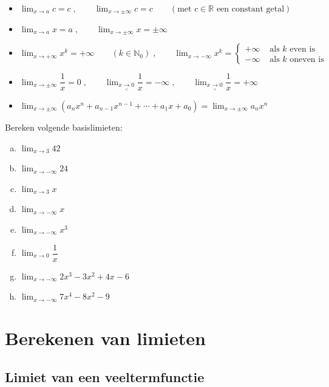 \documentclass[12pt]{article}
\begin{document}
\begin{itemize}
\item $\displaystyle\lim_{x\to a}c=c\;,\qquad\lim_{x\to \pm\infty}c=c\qquad (\mbox{met } c\in\mathbb{R}\mbox{ een constant getal})$
\item $\displaystyle\lim_{x\to a}x=a\;,\qquad\lim_{x\to \pm\infty}x=\pm\infty$
\item $\displaystyle\lim_{x\to+\infty}x^k = +\infty\qquad(k\in\mathbb{N}_0)\;,\qquad \displaystyle\lim_{x\to-\infty}x^k = \begin{cases}+\infty &\mbox{ als $k$ even is}\\-\infty &\mbox{ als $k$ oneven is} \end{cases}$
\item $\displaystyle\lim_{x\to\pm\infty}\dfrac{1}{x}=0\;,\qquad\lim_{x\underset{<}{\to}0}\dfrac{1}{x}=-\infty\;,\qquad \displaystyle\lim_{x\underset{>}{\to}0}\dfrac{1}{x}=+\infty$
\item $\displaystyle\lim_{x\to\pm\infty}\left(a_nx^n+a_{n-1}x^{n-1}+\cdots+a_1x+a_0\right) = \lim_{x\to\pm\infty}a_nx^n$
\end{itemize}

\begin{oefening}
  Bereken volgende basislimieten:
  \begin{enumerate}[(a)]
    \itemsep1em
  \item $\displaystyle \lim_{x\to 3}42$
  \item $\displaystyle \lim_{x\to -\infty}24$
  \item $\displaystyle \lim_{x\to 3}x$
  \item $\displaystyle \lim_{x\to -\infty}x$
  \item $\displaystyle \lim_{x\to -\infty}x^3$
  \item $\displaystyle \lim_{x\to 0}\dfrac{1}{x}$
  \item $\displaystyle \lim_{x\to -\infty}2x^3-3x^2+4x-6$
  \item $\displaystyle \lim_{x\to -\infty}7x^4-8x^2-9$
  \end{enumerate}
\end{oefening}


\pagebreak
\section{Berekenen van limieten}

\subsection{Limiet van een veeltermfunctie}
\end{document}

